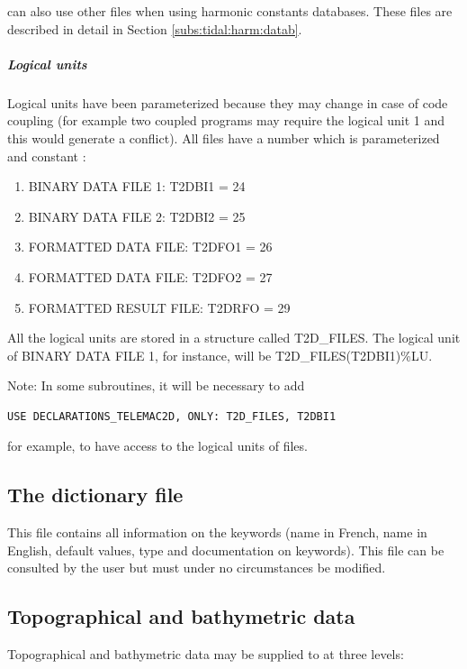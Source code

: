   can also use other files when using harmonic constants databases. These files are described in detail in Section \ref{subs:tidal:harm:datab}.


\subparagraph{ Logical units}

 Logical units have been parameterized because they may change in case of code coupling (for example two coupled programs may require the logical unit 1 and this would generate a conflict). All files have a number which is parameterized and constant :

\begin{enumerate}
\item  BINARY DATA FILE 1: T2DBI1 = 24

\item  BINARY DATA FILE 2: T2DBI2 = 25

\item  FORMATTED DATA FILE: T2DFO1 = 26

\item  FORMATTED DATA FILE: T2DFO2 = 27

\item  FORMATTED RESULT FILE: T2DRFO = 29
\end{enumerate}

 All the logical units are stored in a structure called T2D\_FILES. The logical unit of BINARY DATA FILE 1, for instance, will be T2D\_FILES(T2DBI1)\%LU.

\begin{WarningBlock}{Note:}
 In some subroutines, it will be necessary to add
\begin{lstlisting}[language=TelFortran]
  USE DECLARATIONS_TELEMAC2D, ONLY: T2D_FILES, T2DBI1
\end{lstlisting}
 for example, to have access to the logical units of files.
\end{WarningBlock}

\subsection{ The dictionary file}

 This file contains all information on the keywords (name in French, name in English, default values, type and documentation on keywords). This file can be consulted by the user but must under no circumstances be modified.


\subsection{ Topographical and bathymetric data}
\label{subs:topo:bathy:data}
 Topographical and bathymetric data may be supplied to  at three levels:

